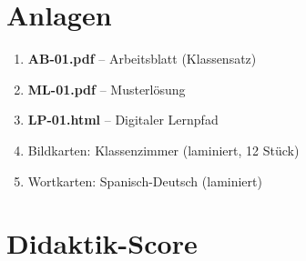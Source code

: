 \documentclass[11pt,a4paper]{article}
\begin{document}
\section{Anlagen}

\begin{enumerate}
    \item \textbf{AB-01.pdf} -- Arbeitsblatt (Klassensatz)
    \item \textbf{ML-01.pdf} -- Musterlösung
    \item \textbf{LP-01.html} -- Digitaler Lernpfad
    \item Bildkarten: Klassenzimmer (laminiert, 12 Stück)
    \item Wortkarten: Spanisch-Deutsch (laminiert)
\end{enumerate}

\newpage
\section{Didaktik-Score}
\end{document}
